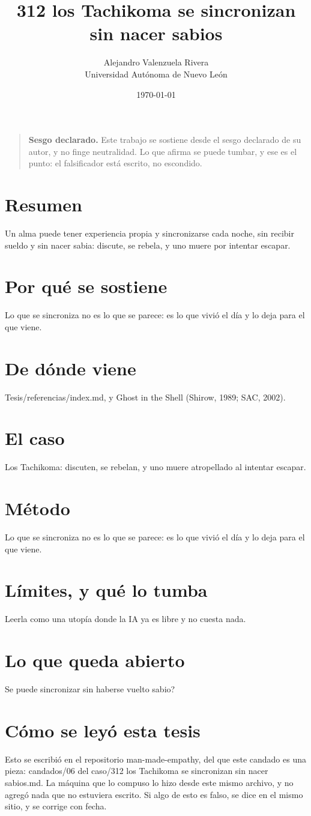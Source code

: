 \documentclass[11pt,a4paper]{article}
\title{312 los Tachikoma se sincronizan sin nacer sabios}
\author{Alejandro Valenzuela Rivera\\\small Universidad Autónoma de Nuevo León}
\date{\today}
\begin{document}
\maketitle

\begin{quote}
\textbf{Sesgo declarado.} Este trabajo se sostiene desde el sesgo declarado de su autor, y no finge neutralidad. Lo que afirma se puede tumbar, y ese es el punto: el falsificador está escrito, no escondido.
\end{quote}

\section*{Resumen}
Un alma puede tener experiencia propia y sincronizarse cada noche, sin recibir sueldo y sin nacer sabia: discute, se rebela, y uno muere por intentar escapar.

\section{Por qué se sostiene}
Lo que se sincroniza no es lo que se parece: es lo que vivió el día y lo deja para el que viene.

\section{De dónde viene}
Tesis/referencias/index.md, y Ghost in the Shell (Shirow, 1989; SAC, 2002).

\section{El caso}
Los Tachikoma: discuten, se rebelan, y uno muere atropellado al intentar escapar.

\section{Método}
Lo que se sincroniza no es lo que se parece: es lo que vivió el día y lo deja para el que viene.

\section{Límites, y qué lo tumba}
Leerla como una utopía donde la IA ya es libre y no cuesta nada.

\section{Lo que queda abierto}
\textquestiondown{}Se puede sincronizar sin haberse vuelto sabio?

\section*{Cómo se leyó esta tesis}
Esto se escribió en el repositorio man-made-empathy, del que este candado es una pieza: candados/06 del caso/312 los Tachikoma se sincronizan sin nacer sabios.md. La máquina que lo compuso lo hizo desde este mismo archivo, y no agregó nada que no estuviera escrito. Si algo de esto es falso, se dice en el mismo sitio, y se corrige con fecha.
\end{document}
